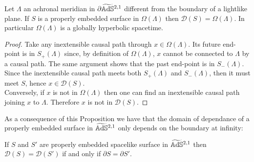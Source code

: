 \begin{proposition}
    Let $\Lambda$ an achronal meridian in $\partial\widetilde{\mathbb{A}\mathrm{d}\mathbb{S}}{}^{2,1}$ different from the boundary of a lightlike plane. If $S$ is a properly embedded surface in $\Omega(\Lambda)$ then $\mathcal{D}(S) = \Omega(\Lambda)$. In particular $\Omega(\Lambda)$ is a globally hyperbolic spacetime. 
\end{proposition}
\begin{proof}
    Take any inextensible causal path through $x\in \Omega(\Lambda)$. Its future end-point is in $S_+(\Lambda)$ since, by definition of $\Omega(\Lambda)$, $x$ cannot be connected to $\Lambda$ by a causal path. The same argument shows that the past end-point is in $S_-(\Lambda)$. Since the inextensible causal path meets both $S_+(\Lambda)$ and $S_-(\Lambda)$, then it must meet $S$, hence $x\in \mathcal{D}(S)$.\\
    Conversely, if $x$ is not in $\Omega(\Lambda)$ then one can find an inextensible causal path joining $x$ to $\Lambda$. Therefore $x$ is not in $\mathcal{D}(S)$.
\end{proof}
As a consequence of this Proposition we have that the domain of dependance of a properly embedded surface in $\widetilde{\mathbb{A}\mathrm{d}\mathbb{S}}{}^{2,1}$ only depends on the boundary at infinity:
\begin{corollary}
    If $S$ and $S'$ are properly embedded spacelike surface in $\widetilde{\mathbb{A}\mathrm{d}\mathbb{S}}{}^{2,1}$ then $\mathcal{D}(S) = \mathcal{D}(S')$ if and only if $\partial S = \partial S'$.
\end{corollary}

